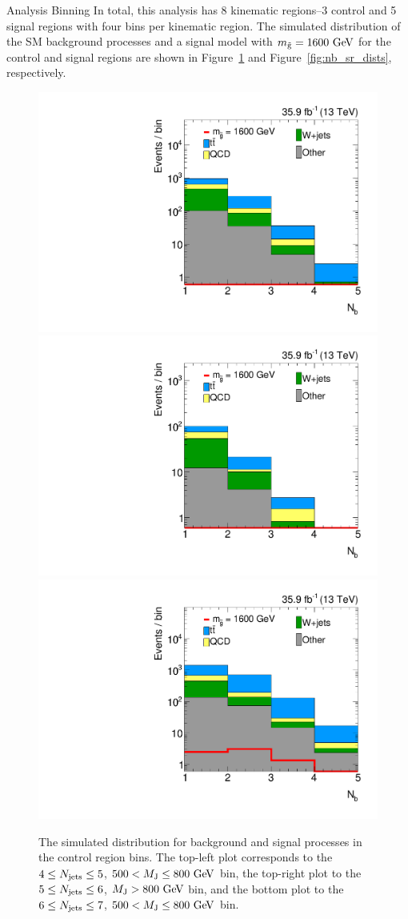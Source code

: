 \begin{section}{Analysis Binning}
In total, this analysis has 8 kinematic regions--3 control and 5 signal regions with four \Nb bins per kinematic region.
The simulated \Nb distribution of the SM background processes and a signal model with $m_{\tilde{\mathrm{g}}} = 1600~\mathrm{Ge\kern -0.1em V}$ for the control and signal regions 
are shown in Figure~\ref{fig:nb_cr_dists} and Figure~\ref{fig:nb_sr_dists}, respectively.

\begin{figure}[tbp!]
\centering
\includegraphics[angle=0,width=0.35\columnwidth]{fig/nb_nlep1_nj45_lowmj.pdf}
\includegraphics[angle=0,width=0.35\columnwidth]{fig/nb_nlep1_nj45_highmj.pdf}
\includegraphics[angle=0,width=0.35\columnwidth]{fig/nb_nlep1_nj67_lowmj.pdf}
\caption{The simulated \Nb distribution for background and signal processes in the control region bins.
The top-left plot corresponds to the $4 \leq N_{\mathrm{jets}} \leq 5$, $500 < M_{\mathrm{J}} \leq 800~\mathrm{Ge\kern -0.1em V}$ bin, the top-right plot to the $5 \leq N_{\mathrm{jets}} \leq 6$, $M_{\mathrm{J}} > 800~\mathrm{Ge\kern -0.1em V}$ bin, and the bottom plot to the $6 \leq N_{\mathrm{jets}} \leq 7$, $500 < M_{\mathrm{J}} \leq 800~\mathrm{Ge\kern -0.1em V}$ bin.}
\label{fig:nb_cr_dists}
\end{figure}


\end{section}
